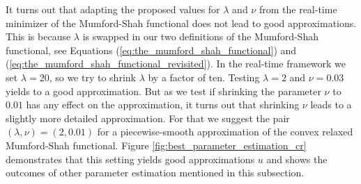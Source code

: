 \documentclass[abstracton]{scrreprt}
\begin{document}
            It turns out that adapting the proposed values for $\lambda$ and $\nu$ from the real-time minimizer of the Mumford-Shah functional does not lead to good approximations. This is because $\lambda$ is swapped in our two definitions of the Mumford-Shah functional, see Equations (\ref{eq:the_mumford_shah_functional}) and (\ref{eq:the_mumford_shah_functional_revisited}). In the real-time framework we set $\lambda = 20$, so we try to shrink $\lambda$ by a factor of ten. Testing $\lambda = 2$ and $\nu = 0.03$ yields to a good approximation. But as we test if shrinking the parameter $\nu$ to $0.01$ has any effect on the approximation, it turns out that shrinking $\nu$ leads to a slightly more detailed approximation. For that we suggest the pair $(\lambda, \nu) = (2, 0.01)$ for a piecewise-smooth approximation of the convex relaxed Mumford-Shah functional. Figure \ref{fig:best_parameter_estimation_cr} demonstrates that this setting yields good approximations $u$ and shows the outcomes of other parameter estimation mentioned in this subsection.
\end{document}
